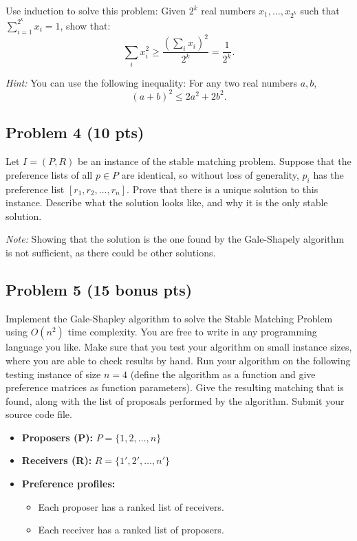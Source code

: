 \documentclass[12pt]{article}
\begin{document}
Use induction to solve this problem: Given $2^k$ real numbers $x_1, \ldots, x_{2^k}$ such that $\sum_{i=1}^{2^k} x_i = 1$, show that:
\[
\sum_{i} x_i^2 \geq \frac{\left(\sum_{i} x_i\right)^2}{2^k} = \frac{1}{2^k}.
\]

\textit{Hint:} You can use the following inequality: For any two real numbers $a, b$, 
\[
(a+b)^2 \leq 2a^2 + 2b^2.
\]

\subsection*{Problem 4 (10 pts)}

Let $I = (P, R)$ be an instance of the stable matching problem. Suppose that the preference lists of all $p \in P$ are identical, so without loss of generality, $p_i$ has the preference list $[r_1, r_2, \ldots, r_n]$. Prove that there is a unique solution to this instance. Describe what the solution looks like, and why it is the only stable solution.

\textit{Note:} Showing that the solution is the one found by the Gale-Shapely algorithm is not sufficient, as there could be other solutions.

\subsection*{Problem 5 (15 bonus pts)}

Implement the Gale-Shapley algorithm to solve the Stable Matching Problem using $O(n^2)$ time complexity. You are free to write in any programming language you like. Make sure that you test your algorithm on small instance sizes, where you are able to check results by hand. Run your algorithm on the following testing instance of size $n=4$ (define the algorithm as a function and give preference matrices as function parameters). Give the resulting matching that is found, along with the list of proposals performed by the algorithm. Submit your source code file.

\begin{itemize}
    \item \textbf{Proposers (P):} $P= \{1, 2, \ldots, n\}$
    \item \textbf{Receivers (R):} $R= \{1', 2', \ldots, n'\}$
    \item \textbf{Preference profiles:}
    \begin{itemize}
        \item Each proposer has a ranked list of receivers.
        \item Each receiver has a ranked list of proposers.
    \end{itemize}
\end{itemize}
\end{document}
